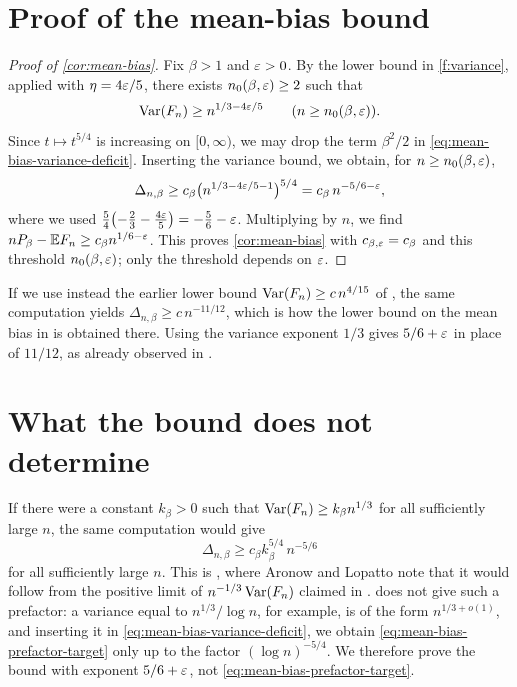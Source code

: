 \section{Proof of the mean-bias bound}\label{sec:bias-proof}

\begin{proof}[Proof of \cref{cor:mean-bias}]
Fix $\beta>1$ and $\varepsilon>0$. By the lower bound in \eqref{f:variance}, applied with $\eta=4\varepsilon/5$, there exists $n_0(\beta,\varepsilon)\ge2$ such that
\[
 \operatorname{Var}(F_n)\ge n^{1/3-4\varepsilon/5}\qquad(n\ge n_0(\beta,\varepsilon)).
\]
Since $t\mapsto t^{5/4}$ is increasing on $[0,\infty)$, we may drop the term $\beta^2/2$ in \eqref{eq:mean-bias-variance-deficit}. Inserting the variance bound, we obtain, for $n\ge n_0(\beta,\varepsilon)$,
\[
 \Delta_{n,\beta}\ge c_\beta\bigl(n^{1/3-4\varepsilon/5-1}\bigr)^{5/4}=c_\beta\,n^{-5/6-\varepsilon},
\]
where we used $\frac54\bigl(-\frac23-\frac{4\varepsilon}{5}\bigr)=-\frac56-\varepsilon$. Multiplying by $n$, we find $nP_\beta-\mathbb E F_n\ge c_\beta n^{1/6-\varepsilon}$. This proves \cref{cor:mean-bias} with $c_{\beta,\varepsilon}=c_\beta$ and this threshold $n_0(\beta,\varepsilon)$; only the threshold depends on $\varepsilon$.
\end{proof}

If we use instead the earlier lower bound $\operatorname{Var}(F_n)\ge c\,n^{4/15}$ of \cite[Theorem~1.4]{quantitative-parisi}, the same computation yields $\Delta_{n,\beta}\ge c\,n^{-11/12}$, which is how the lower bound on the mean bias in \cite[Theorem~1.4]{quantitative-parisi} is obtained there. Using the variance exponent $1/3$ gives $5/6+\varepsilon$ in place of $11/12$, as already observed in \cite[Section~1.6, p.~11]{hexagon-bias}.

\section{What the bound does not determine}\label{sec:bias-scope}

\begin{remark}\label{rem:bias-prefactor}
If there were a constant $k_\beta>0$ such that $\operatorname{Var}(F_n)\ge k_\beta n^{1/3}$ for all sufficiently large $n$, the same computation would give
\begin{equation}\label{eq:mean-bias-prefactor-target}
 \Delta_{n,\beta}\ge c_\beta k_\beta^{5/4}\,n^{-5/6}
\end{equation}
for all sufficiently large $n$. This is \cite[(1.4), p.~11]{hexagon-bias}, where Aronow and Lopatto note that it would follow from the positive limit of $n^{-1/3}\operatorname{Var}(F_n)$ claimed in \cite[Theorem~1.2]{oai-limiting-law}.  does not give such a prefactor: a variance equal to $n^{1/3}/\log n$, for example, is of the form $n^{1/3+o(1)}$, and inserting it in \eqref{eq:mean-bias-variance-deficit}, we obtain \eqref{eq:mean-bias-prefactor-target} only up to the factor $(\log n)^{-5/4}$. We therefore prove the bound with exponent $5/6+\varepsilon$, not \eqref{eq:mean-bias-prefactor-target}.
\end{remark}

